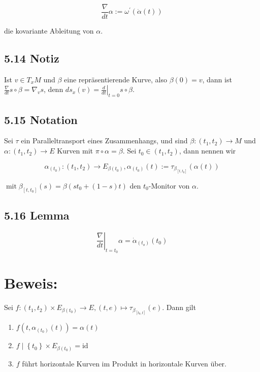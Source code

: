 \documentclass[10pt, letterpaper]{article}
\begin{document}
$$
\frac{\nabla}{d t} \alpha:=\omega^{\prime}(\dot{\alpha}(t))
$$

die kovariante Ableitung von $\alpha$.

\subsection*{5.14 Notiz}
Ist $v \in T_{x} M$ und $\beta$ eine repräsentierende Kurve, also $\beta(0)=v$, dann ist $\frac{\nabla}{d t} s \circ \beta=\nabla_{v} s$, denn $d s_{x}(v)=\left.\frac{d}{d t}\right|_{t=0} s \circ \beta$.

\subsection*{5.15 Notation}
Sei $\tau$ ein Paralleltransport eines Zusammenhangs, und sind $\beta:\left(t_{1}, t_{2}\right) \rightarrow M$ und $\alpha:\left(t_{1}, t_{2}\right) \rightarrow E$ Kurven mit $\pi \circ \alpha=\beta$. Sei $t_{0} \in\left(t_{1}, t_{2}\right)$, dann nennen wir

$$
\alpha_{\left(t_{0}\right)}:\left(t_{1}, t_{2}\right) \rightarrow E_{\beta\left(t_{0}\right)}, \alpha_{\left(t_{0}\right)}(t):=\tau_{\beta_{\left[t, t_{0}\right]}}(\alpha(t))
$$

$\operatorname{mit} \beta_{\left[t, t_{0}\right]}(s)=\beta\left(s t_{0}+(1-s) t\right)$ den $t_{0}$-Monitor von $\alpha$.

\subsection*{5.16 Lemma}
$$
\left.\frac{\nabla}{d t}\right|_{t=t_{0}} \alpha=\dot{\alpha}_{\left(t_{o}\right)}\left(t_{0}\right)
$$

\section*{Beweis:}
Sei $f:\left(t_{1}, t_{2}\right) \times E_{\beta\left(t_{0}\right)} \rightarrow E,(t, e) \mapsto \tau_{\beta_{\left[t_{0}, t\right]}}(e)$. Dann gilt

\begin{enumerate}
  \item $f\left(t, \alpha_{\left(t_{0}\right)}(t)\right)=\alpha(t)$
  \item $f \mid\left\{t_{0}\right\} \times E_{\beta\left(t_{0}\right)}=\mathrm{id}$
  \item $f$ führt horizontale Kurven im Produkt in horizontale Kurven über.
\end{enumerate}
\end{document}
